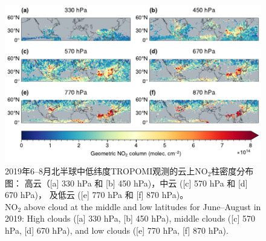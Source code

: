 \begin{figure}[!htbp]
    \centering
    \includegraphics[width=15cm]{./figures/no2geo_tropomi.pdf}
    \caption{
    2019年6--8月北半球中低纬度TROPOMI观测的云上NO$_2$柱密度分布图：
    高云（[a] 330 hPa 和 [b] 450 hPa)，中云 ([c] 570 hPa 和 [d] 670 hPa)，
    及低云 ([e] 770 hPa 和 [f] 870 hPa)。 \\
    NO$_2$ above cloud at the middle and low latitudes for June--August in 2019:
    High clouds ([a] 330 hPa, [b] 450 hPa), middle clouds ([c] 570 hPa, [d] 670 hPa),
    and low clouds ([e] 770 hPa, [f] 870 hPa).
    }
    \label{fig:no2geo_tropomi}
\end{figure}


